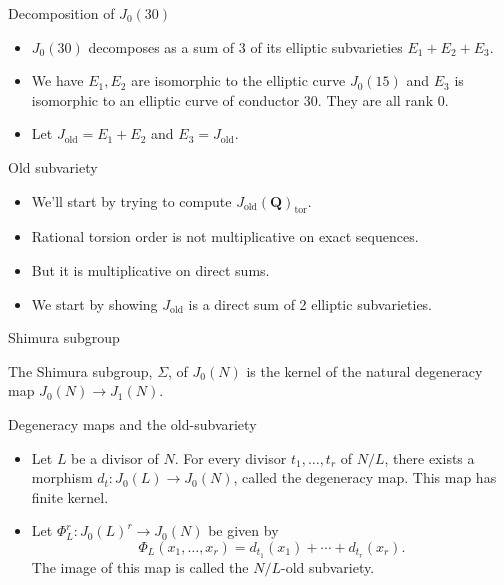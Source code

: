 \documentclass{beamer}
\newcommand{\QQ}{\mathbf{Q}}
\newcommand{\tor}{\mathrm{tor}}
\newcommand{\old}{\mathrm{old}}
\begin{document}
\begin{frame}{Decomposition of $J_0(30)$}
    \begin{itemize}
        \item
            $J_0(30)$ decomposes as a sum of 3 of its elliptic subvarieties
            $E_1+E_2+E_3$.
        \item
            We have $E_1, E_2$ are isomorphic to the elliptic curve $J_0(15)$
            and $E_3$ is isomorphic to an elliptic curve of conductor 30. They
            are all rank 0.
        \item
            Let $J_\old=E_1+E_2$ and $E_3=J_\old$.
    \end{itemize}
\end{frame}

\begin{frame}{Old subvariety}
    \begin{itemize}
        \item
            We'll start by trying to compute $J_\old(\QQ)_\tor$.
        \item
            Rational torsion order is not multiplicative on exact sequences.
        \item
            But it is multiplicative on direct sums.
        \item
            We start by showing $J_\old$ is a direct sum of 2 elliptic
            subvarieties.
    \end{itemize}
\end{frame}

\begin{frame}{Shimura subgroup}
    \begin{definition}
        The Shimura subgroup, $\Sigma$, of $J_0(N)$ is the kernel of the
        natural degeneracy map $J_0(N)\to J_1(N)$.
    \end{definition}
\end{frame}

\begin{frame}{Degeneracy maps and the old-subvariety}
    \begin{itemize}
        \item
            Let $L$ be a divisor of $N$. For every divisor $t_1,\ldots,t_r$ of
            $N/L$, there exists a morphism $d_t:J_0(L)\to J_0(N)$, called the
            degeneracy map. This map has finite kernel.
        \item
            Let $\Phi_L ^r: J_0(L)^r \to J_0(N)$ be given by
            \[
                \Phi_L(x_1,\ldots,x_r)=d_{t_1}(x_1)+\cdots+d_{t_r}(x_r).
            \]
            The image of this map is called the $N/L$-old subvariety.
    \end{itemize}
\end{frame}
\end{document}
